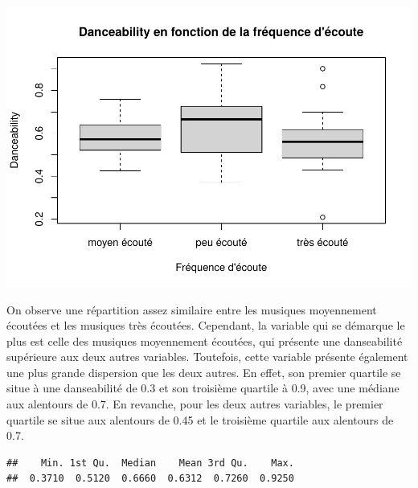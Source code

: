 \documentclass[
]{article}
\newenvironment{Shaded}{\begin{snugshade}}{\end{snugshade}}
\newcommand{\FunctionTok}[1]{\textcolor[rgb]{0.00,0.00,0.00}{#1}}
\newcommand{\NormalTok}[1]{#1}
\newcommand{\SpecialCharTok}[1]{\textcolor[rgb]{0.00,0.00,0.00}{#1}}
\newcommand{\StringTok}[1]{\textcolor[rgb]{0.31,0.60,0.02}{#1}}
\begin{document}
\includegraphics{spotify_analysis_files/figure-latex/unnamed-chunk-9-1.pdf}

On observe une répartition assez similaire entre les musiques
moyennement écoutées et les musiques très écoutées. Cependant, la
variable qui se démarque le plus est celle des musiques moyennement
écoutées, qui présente une danseabilité supérieure aux deux autres
variables. Toutefois, cette variable présente également une plus grande
dispersion que les deux autres. En effet, son premier quartile se situe
à une danseabilité de 0.3 et son troisième quartile à 0.9, avec une
médiane aux alentours de 0.7. En revanche, pour les deux autres
variables, le premier quartile se situe aux alentours de 0.45 et le
troisième quartile aux alentours de 0.7.

\begin{Shaded}
\end{Shaded}

\begin{verbatim}
##    Min. 1st Qu.  Median    Mean 3rd Qu.    Max. 
##  0.3710  0.5120  0.6660  0.6312  0.7260  0.9250
\end{verbatim}

\begin{Shaded}
\end{Shaded}
\end{document}
